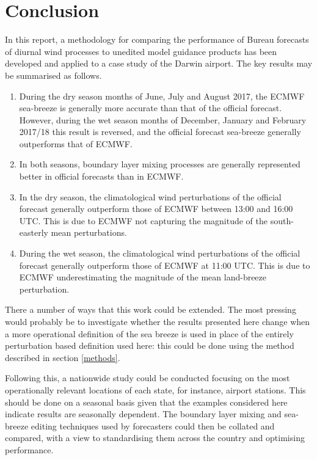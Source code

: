 \documentclass[10pt]{article}
\begin{document}
\section{Conclusion}
In this report, a methodology for comparing the performance of Bureau forecasts of diurnal wind processes to unedited model guidance products has been developed and applied to a case study of the Darwin airport. The key results may be summarised as follows.
\begin{enumerate}
\item
During the dry season months of June, July and August 2017, the ECMWF sea-breeze is generally more accurate than that of the official forecast. However, during the wet season months of December, January and February 2017/18 this result is reversed, and the official forecast sea-breeze generally outperforms that of ECMWF. 
\item
In both seasons, boundary layer mixing processes are generally represented better in official forecasts than in ECMWF.
\item
In the dry season, the climatological wind perturbations of the official forecast generally outperform those of ECMWF between 13:00 and 16:00 UTC. This is due to ECMWF not capturing the magnitude of the south-easterly mean perturbations. 
\item
During the wet season, the climatological wind perturbations of the official forecast generally outperform those of ECMWF at 11:00 UTC. This is due to ECMWF underestimating the magnitude of the mean land-breeze perturbation.
\end{enumerate}    

There a number of ways that this work could be extended. The most pressing would probably be to investigate whether the results presented here change when a more operational definition of the sea breeze is used in place of the entirely perturbation based definition used here: this could be done using the method described in section \ref{methods}.

Following this, a nationwide study could be conducted focusing on the most operationally relevant locations of each state, for instance, airport stations. This should be done on a seasonal basis given that the examples considered here indicate results are seasonally dependent. The boundary layer mixing and sea-breeze editing techniques used by forecasters could then be collated and compared, with a view to standardising them across the country and optimising performance.




\end{document}
